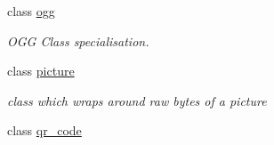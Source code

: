 \begin{DoxyCompactItemize}
class \hyperlink{classrapp_1_1object_1_1ogg}{ogg}
\begin{DoxyCompactList}\small\item\em O\-G\-G Class specialisation. \end{DoxyCompactList}\item 
class \hyperlink{classrapp_1_1object_1_1picture}{picture}
\begin{DoxyCompactList}\small\item\em class which wraps around raw bytes of a picture \end{DoxyCompactList}\item 
class \hyperlink{classrapp_1_1object_1_1qr__code}{qr\-\_\-code}
\end{DoxyCompactItemize}

